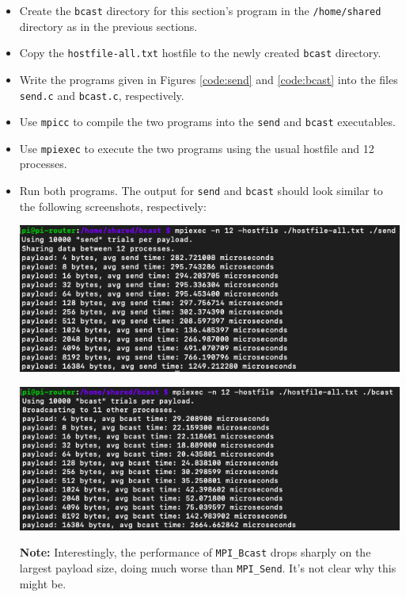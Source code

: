 \documentclass{article}
\begin{document}
\begin{itemize}
\item Create the \texttt{bcast} directory for this section's program in the \texttt{/home/shared} directory as in the previous sections.

\item Copy the \texttt{hostfile-all.txt} hostfile to the newly created \texttt{bcast} directory.

\item Write the programs given in Figures \ref{code:send} and \ref{code:bcast} into the files \texttt{send.c} and \texttt{bcast.c}, respectively.

\item Use \texttt{mpicc} to compile the two programs into the \texttt{send} and \texttt{bcast} executables.

\item Use \texttt{mpiexec} to execute the two programs using the usual hostfile and 12 processes.

\item Run both programs. The output for \texttt{send} and \texttt{bcast} should look similar to the following screenshots, respectively:

\includegraphics[width=\textwidth]{images/send-output.png}

\includegraphics[width=\textwidth]{images/bcast-output.png}

\textbf{Note:} Interestingly, the performance of \texttt{MPI\_Bcast} drops sharply on the largest payload size, doing much worse than \texttt{MPI\_Send}. It's not clear why this might be.
\end{itemize}
\end{document}
